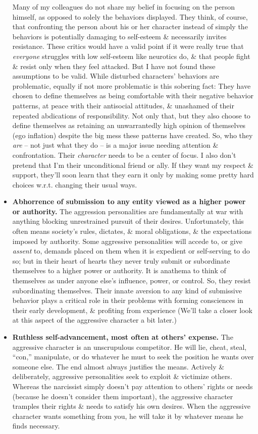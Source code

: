 \documentclass{article}
\numberwithin{equation}{section}
\begin{document}
\begin{itemize}
    Many of my colleagues do not share my belief in focusing on the person himself, as opposed to solely the behaviors displayed. They think, of course, that confronting the person about his or her character instead of simply the behaviors is potentially damaging to self-esteem \& necessarily invites resistance. These critics would have a valid point if it were really true that \textit{everyone} struggles with low self-esteem like neurotics do, \& that people fight \& resist only when they feel attacked. But I have not found these assumptions to be valid. While disturbed characters' behaviors are problematic, equally if not more problematic is this sobering fact: They have chosen to define themselves as being comfortable with their negative behavior patterns, at peace with their antisocial attitudes, \& unashamed of their repeated abdications of responsibility. Not only that, but they also choose to define themselves as retaining an unwarrantedly high opinion of themselves (ego inflation) despite the big mess these patterns have created. So, who they \textit{are} -- not just what they do -- is a major issue needing attention \& confrontation. Their \textit{character} needs to be a center of focus. I also don't pretend that I'm their unconditional friend or ally. If they want my respect \& support, they'll soon learn that they earn it only by making some pretty hard choices w.r.t. changing their usual ways.
    \item \textbf{Abhorrence of submission to any entity viewed as a higher power or authority.} The aggression personalities are fundamentally at war with anything blocking unrestrained pursuit of their desires. Unfortunately, this often means society's rules, dictates, \& moral obligations, \& the expectations imposed by authority. Some aggressive personalities will accede to, or give \textit{assent} to, demands placed on them when it is expedient or self-serving to do so; but in their heart of hearts they never truly submit or subordinate themselves to a higher power or authority. It is anathema to think of themselves as under anyone else's influence, power, or control. So, they resist subordinating themselves. Their innate aversion to any kind of submissive behavior plays a critical role in their problems with forming consciences in their early development, \& profiting from experience (We'll take a closer look at this aspect of the aggressive character a bit later.)
    \item \textbf{Ruthless self-advancement, most often at others' expense.} The aggressive character is an unscrupulous competitor. He will lie, cheat, steal, ``con,'' manipulate, or do whatever he must to seek the position he wants over someone else. The end almost always justifies the means. Actively \& deliberately, aggressive personalities seek to exploit \& victimize others. Whereas the narcissist simply doesn't pay attention to others' rights or needs (because he doesn't consider them important), the aggressive character tramples their rights \& needs to satisfy his own desires. When the aggressive character wants something from you, he will take it by whatever means he finds necessary.

\end{itemize}
\end{document}
